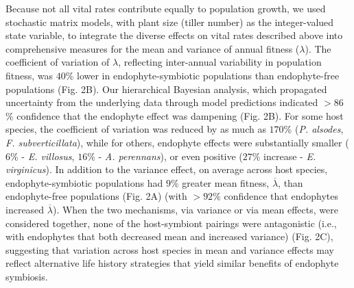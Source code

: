 \documentclass[12pt]{article}
\begin{document}
 Because not all vital rates contribute equally to population growth, we used stochastic matrix models, with plant size (tiller number) as the integer-valued state variable, to integrate the diverse effects on vital rates described above into comprehensive measures for the mean and variance of annual fitness ($\lambda$). 
 The coefficient of variation of $\lambda$, reflecting inter-annual variability in population fitness, was $40$\% lower in endophyte-symbiotic populations than endophyte-free populations (Fig. 2B).
 Our hierarchical Bayesian analysis, which propagated uncertainty from the underlying data through model predictions indicated $>86$\% confidence that the endophyte effect was dampening (Fig. 2B).
For some host species, the coefficient of variation was reduced by as much as $170$\% (\emph{P. alsodes}, \emph{F. subverticillata}), while for others, endophyte effects were substantially smaller ($6$\% - \emph{E. villosus}, $16$\% - \emph{A. perennans}), or even positive ($27$\% increase - \emph{E. virginicus}).
In addition to the variance effect, on average across host species, endophyte-symbiotic populations had $9$\% greater mean fitness, $\overline{\lambda}$, than endophyte-free populations (Fig. 2A) (with $>92$\% confidence that endophytes increased $\overline{\lambda}$).
When the two mechanisms, via variance or via mean effects, were considered together, none of the host-symbiont pairings were antagonistic (i.e., with endophytes that both decreased mean and increased variance) (Fig. 2C), suggesting that variation across host species in mean and variance effects may reflect alternative life history strategies that yield similar benefits of endophyte symbiosis.
\end{document}
